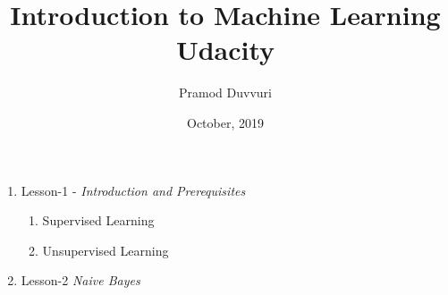 \documentclass[11pt]{article}
\title{Introduction to Machine Learning \\
	Udacity}
\author{Pramod Duvvuri}
\date{October, 2019}
\begin{document}
	\maketitle
	\begin{enumerate}
		\item Lesson-1 - \textit{Introduction and Prerequisites}
			\begin{enumerate}
			\item Supervised Learning
			\item Unsupervised Learning
		\end{enumerate}
	    \item Lesson-2 \textit{Naive Bayes}
	\end{enumerate}
\end{document}
